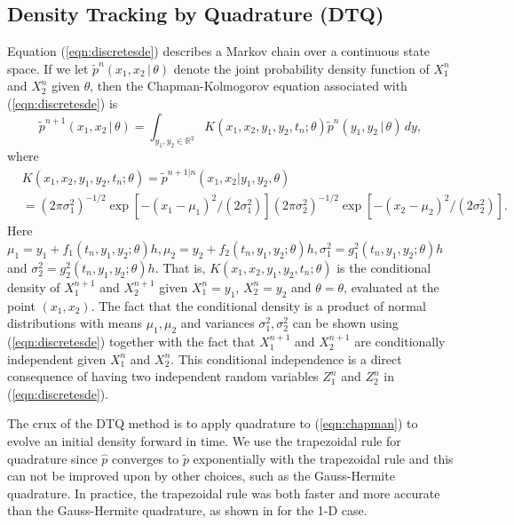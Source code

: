 \documentclass[graybox]{svmult}
\begin{document}
\subsection{Density Tracking by Quadrature (DTQ)}
\label{subsec:2-1}
Equation (\ref{eqn:discretesde}) describes a Markov chain over a continuous state space.  If we let $\widetilde{p}^n(x_1,x_2 \, | \, \theta)$ denote the joint probability density function of $X_1^n$ and $X_2^n$ given $\theta$, then the Chapman-Kolmogorov equation associated with (\ref{eqn:discretesde})  is
\begin{equation}
\label{eqn:chapman}
\widetilde{p}^{n+1}(x_1,x_2 \, | \, \theta) = \int_{y_1,y_2 \in \mathbb{R}^2} K(x_1,x_2,y_1,y_2,t_n; \theta) \widetilde{p}^n(y_1,y_2 \, | \, \theta) \, dy,
\end{equation}
where
\begin{align}
&K(x_1,x_2,y_1,y_2,t_n; \theta) = \widetilde{p}^{{n+1} | {n}}(x_1,x_2 | y_1,y_2,\theta) \nonumber\\
&= (2 \pi \sigma_1^2)^{-1/2} \exp \left[ -(x_1 - \mu_1)^2/(2 \sigma_1^2) \right] (2 \pi \sigma_2^2)^{-1/2} \exp \left[ -(x_2 - \mu_2)^2/(2 \sigma_2^2) \right]\nonumber.
\end{align}
Here $\mu_1 = y_1 + f_1(t_n,y_1,y_2; \theta) h,  \mu_2 = y_2 + f_2(t_n,y_1,y_2; \theta) h,  \sigma_1^2 = g_1^2(t_n,y_1,y_2; \theta) h$ and  $\sigma_2^2 = g_2^2(t_n,y_1,y_2; \theta) h$. That is, $K(x_1,x_2,y_1,y_2,t_n; \theta)$ is the conditional density of $X_1^{n+1}$ and $X_2^{n+1}$ given $X_1^n = y_1$, $X_2^n = y_2$ and $\theta = \theta$, evaluated at the point $(x_1,x_2)$.  The fact that the conditional density is a product of normal distributions with means $\mu_1, \mu_2$ and variances $\sigma_1^2, \sigma_2^2$ can be shown using (\ref{eqn:discretesde}) together with the fact that $X_1^{n+1}$ and $X_2^{n+1}$ are conditionally independent given $X_1^n$ and $X_2^n$. This conditional independence is a direct consequence of having two independent random variables $Z_1^n$ and $Z_2^n$ in (\ref{eqn:discretesde}).

The crux of the DTQ method is to apply quadrature to (\ref{eqn:chapman}) to evolve an initial density forward in time. We use the trapezoidal rule for quadrature since $\hat{p}$ converges to $\tilde{p}$ exponentially with the trapezoidal rule and this can not be improved upon by other choices, such as the Gauss-Hermite quadrature. In practice, the trapezoidal rule was both faster and more accurate than the Gauss-Hermite quadrature, as shown in \cite{BhatMadu2016} for the 1-D case.
\end{document}
